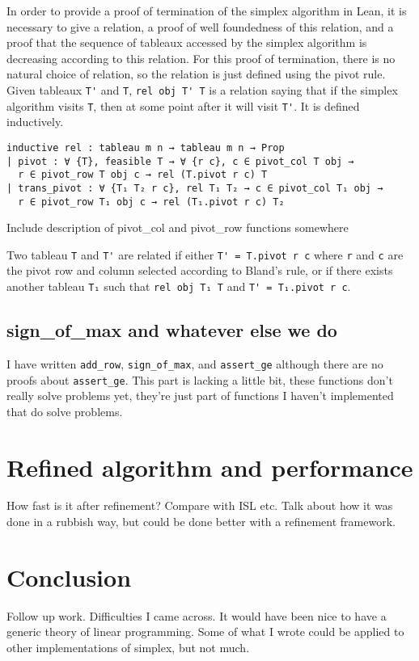 \documentclass[11pt]{article} %
\begin{document}
In order to provide a proof of termination of the simplex algorithm in Lean, it is necessary to give a relation, a proof of well foundedness of this relation, and a proof that the sequence of tableaux accessed by the simplex algorithm is decreasing according to this relation. For this proof of termination, there is no natural choice of relation, so the relation is just defined using the pivot rule. Given tableaux \lstinline|T'| and \lstinline|T|, \lstinline|rel obj T' T| is a relation saying that if the simplex algorithm visits \lstinline|T|, then at some point after it will visit \lstinline|T'|. It is defined inductively.

\begin{lstlisting}
inductive rel : tableau m n → tableau m n → Prop
| pivot : ∀ {T}, feasible T → ∀ {r c}, c ∈ pivot_col T obj →
  r ∈ pivot_row T obj c → rel (T.pivot r c) T
| trans_pivot : ∀ {T₁ T₂ r c}, rel T₁ T₂ → c ∈ pivot_col T₁ obj →
  r ∈ pivot_row T₁ obj c → rel (T₁.pivot r c) T₂
\end{lstlisting}


\color{red}Include description of pivot\_col and pivot\_row functions somewhere\color{black}

Two tableau \lstinline|T| and \lstinline|T'| are related if either \lstinline|T' = T.pivot r c| where \lstinline|r| and \lstinline|c| are the pivot row and column selected according to Bland's rule, or if there exists another tableau \lstinline|T₁| such that \lstinline|rel obj T₁ T| and \lstinline|T' = T₁.pivot r c|.

\subsection{sign\_of\_max and whatever else we do}
\color{red}I have written \lstinline|add_row|, \lstinline|sign_of_max|, and \lstinline|assert_ge| although there are no proofs about \lstinline|assert_ge|. This part is lacking a little bit, these functions don't really solve problems yet, they're just part of functions I haven't implemented that do solve problems.\color{black}

\section{Refined algorithm and performance}
\color{red}How fast is it after refinement? Compare with ISL etc. Talk about how it was done in a rubbish way, but could be done better with a refinement framework.\color{black}

\section{Conclusion}
\color{red}
Follow up work. Difficulties I came across. It would have been nice to have a generic theory of linear programming. Some of what I wrote could be applied to other implementations of simplex, but not much.
\color{black}

\end{document}
